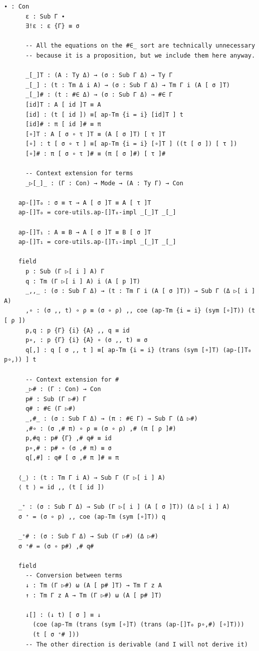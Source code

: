 \documentclass[10pt,a4paper]{article}
\theoremstyle{definition}
\theoremstyle{remark}
\begin{document}
{\begin{Verbatim}[breaklines=true,breakanywhere=true,fontsize=\scriptsize]
      ∙ : Con
      ε : Sub Γ ∙
      ∃!ε : ε {Γ} ≡ σ

      -- All the equations on the #∈_ sort are technically unnecessary
      -- because it is a proposition, but we include them here anyway.

      _[_]T : (A : Ty Δ) → (σ : Sub Γ Δ) → Ty Γ
      _[_] : (t : Tm Δ i A) → (σ : Sub Γ Δ) → Tm Γ i (A [ σ ]T)
      _[_]# : (t : #∈ Δ) → (σ : Sub Γ Δ) → #∈ Γ
      [id]T : A [ id ]T ≡ A
      [id] : (t [ id ]) ≡[ ap-Tm {i = i} [id]T ] t
      [id]# : π [ id ]# ≡ π 
      [∘]T : A [ σ ∘ τ ]T ≡ (A [ σ ]T) [ τ ]T
      [∘] : t [ σ ∘ τ ] ≡[ ap-Tm {i = i} [∘]T ] ((t [ σ ]) [ τ ])
      [∘]# : π [ σ ∘ τ ]# ≡ (π [ σ ]#) [ τ ]#
      
      -- Context extension for terms
      _▷[_]_ : (Γ : Con) → Mode → (A : Ty Γ) → Con

    ap-[]T₀ : σ ≡ τ → A [ σ ]T ≡ A [ τ ]T
    ap-[]T₀ = core-utils.ap-[]T₀-impl _[_]T _[_]

    ap-[]T₁ : A ≡ B → A [ σ ]T ≡ B [ σ ]T
    ap-[]T₁ = core-utils.ap-[]T₁-impl _[_]T _[_]

    field
      p : Sub (Γ ▷[ i ] A) Γ
      q : Tm (Γ ▷[ i ] A) i (A [ p ]T)
      _,,_ : (σ : Sub Γ Δ) → (t : Tm Γ i (A [ σ ]T)) → Sub Γ (Δ ▷[ i ] A)
      ,∘ : (σ ,, t) ∘ ρ ≡ (σ ∘ ρ) ,, coe (ap-Tm {i = i} (sym [∘]T)) (t [ ρ ])
      p,q : p {Γ} {i} {A} ,, q ≡ id
      p∘, : p {Γ} {i} {A} ∘ (σ ,, t) ≡ σ
      q[,] : q [ σ ,, t ] ≡[ ap-Tm {i = i} (trans (sym [∘]T) (ap-[]T₀ p∘,)) ] t

      -- Context extension for #
      _▷# : (Γ : Con) → Con
      p# : Sub (Γ ▷#) Γ
      q# : #∈ (Γ ▷#)
      _,#_ : (σ : Sub Γ Δ) → (π : #∈ Γ) → Sub Γ (Δ ▷#)
      ,#∘ : (σ ,# π) ∘ ρ ≡ (σ ∘ ρ) ,# (π [ ρ ]#)
      p,#q : p# {Γ} ,# q# ≡ id
      p∘,# : p# ∘ (σ ,# π) ≡ σ
      q[,#] : q# [ σ ,# π ]# ≡ π

    ⟨_⟩ : (t : Tm Γ i A) → Sub Γ (Γ ▷[ i ] A)
    ⟨ t ⟩ = id ,, (t [ id ])

    _⁺ : (σ : Sub Γ Δ) → Sub (Γ ▷[ i ] (A [ σ ]T)) (Δ ▷[ i ] A)
    σ ⁺ = (σ ∘ p) ,, coe (ap-Tm (sym [∘]T)) q

    _⁺# : (σ : Sub Γ Δ) → Sub (Γ ▷#) (Δ ▷#)
    σ ⁺# = (σ ∘ p#) ,# q#
        
    field
      -- Conversion between terms
      ↓ : Tm (Γ ▷#) ω (A [ p# ]T) → Tm Γ z A
      ↑ : Tm Γ z A → Tm (Γ ▷#) ω (A [ p# ]T)

      ↓[] : (↓ t) [ σ ] ≡ ↓
        (coe (ap-Tm (trans (sym [∘]T) (trans (ap-[]T₀ p∘,#) [∘]T)))
        (t [ σ ⁺# ]))  
      -- The other direction is derivable (and I will not derive it)


\end{Verbatim}}
\end{document}
